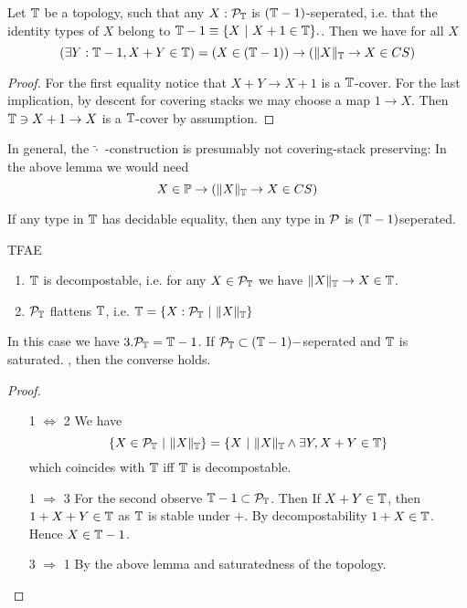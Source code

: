 \begin{lemma}
	Let $\mathbb{T}$ be a topology, such that any $X : \mathcal{P}_{\mathbb{T}}$ is $(\mathbb{T}-1)$-seperated, i.e. that the identity types of $X$ belong to $\mathbb{T}-1  \equiv \{X \ | \ X + 1 \in \mathbb{T}\}.$. Then we have for all $X$
	\[
	(\exists Y : \mathbb{T} - 1 , X + Y \in \mathbb{T}) = (X \in (\mathbb{T} - 1)) \to (\|X\|_{\mathbb{T}} \to X \in CS)
	\]
\end{lemma}
\begin{proof}
	For the first equality notice that $X + Y \to X + 1$ is a $\mathbb{T}$-cover. For the last implication, by descent for covering stacks we may choose a map $1 \to X$. Then $\mathbb{T} \ni X + 1 \to X$ is a $\mathbb{T}$-cover by assumption.
\end{proof}
\begin{warning}
	In general, the $\tilde \cdot$ -construction is presumably not covering-stack preserving: In the above lemma we would need 
	\[
	X \in \mathbb{P} \to (\|X\|_{\mathbb{T}} \to X \in CS)
	\]
\end{warning}

\begin{example}
	If any type in $\mathbb{T}$ has decidable equality, then any type in $\mathcal{P}$ is $(\mathbb{T}-1)$seperated.
\end{example}
\begin{prop}{\label{prop:detectDecompostable}}
TFAE
	\begin{enumerate}
		\item  $\mathbb{T}$ is decompostable, i.e. for any $X \in \mathcal{P}_{\mathbb{T}}$ we have $\|X\|_{\mathbb{T}} \to X \in \mathbb{T}$.
		\item $\mathcal{P}_{\mathbb{T}}$ flattens $\mathbb{T}$, i.e. $\mathbb{T} = \{X : \mathcal{P}_{\mathbb{T}} \ | \ \|X\|_{\mathbb{T}} \}$ %
	\end{enumerate}
	In this case we have  $3 . \mathcal{P}_{\mathbb{T}} = \mathbb{T} - 1$. If $\mathcal{P}_{\mathbb{T}} \subset (\mathbb{T}-1)-$seperated and $\mathbb{T}$ is saturated.  , then the converse holds.
\end{prop}
\begin{proof}
	\ \begin{itemize}
			\item [1 $\Leftrightarrow$ 2]
		We have
		\[
		\{X \in \mathcal{P}_{\mathbb{T}} \ | \ \|X \|_{\mathbb{T}}\} = \{ X \ | \ \|X\|_{\mathbb{T}} \land \exists Y , X + Y \in \mathbb{T} \}
		\] %
		which coincides with $\mathbb{T}$ iff $\mathbb{T}$ is decompostable.
	\item [1 $\Rightarrow$ 3]
	For the second observe $\mathbb{T} - 1 \subset \mathcal{P}_{\mathbb{T}}$. Then If $X + Y \in \mathbb{T}$, then $1 + X + Y \in \mathbb{T}$ as $\mathbb{T}$ is stable under $+$. By decompostability $1 + X \in \mathbb{T}$. Hence $X \in \mathbb{T} - 1$. %
	\item [3 $\Rightarrow$ 1]
	By the above lemma and saturatedness of the topology.

\end{itemize}	
\end{proof}

